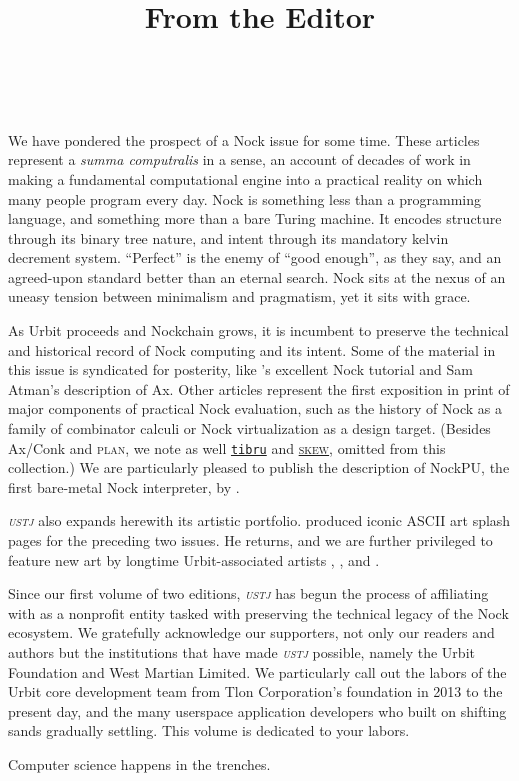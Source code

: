\documentclass[twoside]{article}
\title{From the Editor}
\author{\authorname~\authorpatp \\ \affiliation}
\date{}
\begin{document}
\thispagestyle{firststyle}

\setcounter{page}{1}

We have pondered the prospect of a Nock issue for some time.  These articles represent a \textit{summa computralis} in a sense, an account of decades of work in making a fundamental computational engine into a practical reality on which many people program every day.  Nock is something less than a programming language, and something more than a bare Turing machine.  It encodes structure through its binary tree nature, and intent through its mandatory kelvin decrement system.  ``Perfect'' is the enemy of ``good enough'', as they say, and an agreed-upon standard better than an eternal search.  Nock sits at the nexus of an uneasy tension between minimalism and pragmatism, yet it sits with grace.

As Urbit proceeds and Nockchain grows, it is incumbent to preserve the technical and historical record of Nock computing and its intent.  Some of the material in this issue is syndicated for posterity, like 's excellent Nock tutorial and Sam Atman's description of Ax.  Other articles represent the first exposition in print of major components of practical Nock evaluation, such as the history of Nock as a family of combinator calculi or Nock virtualization as a design target.  (Besides Ax/Conk and \textsc{plan}, we note as well \href{https://github.com/tibru/tibru}{\texttt{tibru}} and \href{https://github.com/urbit/urbit/blob/skew/pkg/hs/urbit-skew/skew.md}{\textsc{skew}}, omitted from this collection.)  We are particularly pleased to publish the description of NockPU, the first bare-metal Nock interpreter, by .

\emph{\textsc{ustj}} also expands herewith its artistic portfolio.   produced iconic ASCII art splash pages for the preceding two issues.  He returns, and we are further privileged to feature new art by longtime Urbit-associated artists , , and .

Since our first volume of two editions, \emph{\textsc{ustj}} has begun the process of affiliating with  as a nonprofit entity tasked with preserving the technical legacy of the Nock ecosystem.  We gratefully acknowledge our supporters, not only our readers and authors but the institutions that have made \emph{\textsc{ustj}} possible, namely the Urbit Foundation and West Martian Limited.  We particularly call out the labors of the Urbit core development team from Tlon Corporation's foundation in 2013 to the present day, and the many userspace application developers who built on shifting sands gradually settling.  This volume is dedicated to your labors.

Computer science happens in the trenches.  \tombstone{}
\end{document}

